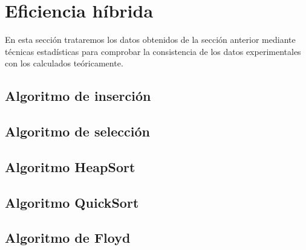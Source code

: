 \documentclass{homework}
\begin{document}
    \section{Eficiencia híbrida}
    
    En esta sección trataremos los datos obtenidos de la sección anterior mediante técnicas estadísticas para
    comprobar la consistencia de los datos experimentales con los calculados teóricamente. 

    \subsection{Algoritmo de inserción}
    \subsection{Algoritmo de selección}
    \subsection{Algoritmo HeapSort}
    \subsection{Algoritmo QuickSort}
    \subsection{Algoritmo de Floyd}

    
\end{document}
